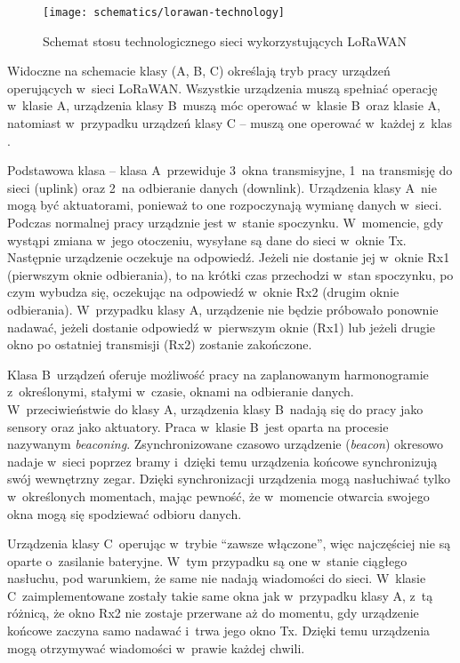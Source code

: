 \begin{figure}[!htbp]
    \centering
    \texttt{[image: schematics/lorawan-technology]}
    \caption{\label{img:lorawan-technology}Schemat stosu technologicznego sieci wykorzystujących LoRaWAN}
\end{figure}

Widoczne na schemacie klasy (A, B, C) określają tryb pracy urządzeń operujących w~sieci LoRaWAN. Wszystkie urządzenia
muszą spełniać operację w~klasie A, urządzenia klasy B~muszą móc operować w~klasie B~oraz klasie A, natomiast
w~przypadku urządzeń klasy C -- muszą one operować w~każdej z~klas \cite{lorawan-device-class}.

Podstawowa klasa -- klasa A~przewiduje 3~okna transmisyjne, 1~na transmisję do sieci (uplink) oraz 2~na odbieranie
danych (downlink). Urządzenia klasy A~nie mogą być aktuatorami, ponieważ to one rozpoczynają wymianę danych w~sieci.
Podczas normalnej pracy urządznie jest w~stanie spoczynku. W~momencie, gdy wystąpi zmiana w~jego otoczeniu, wysyłane są
dane do sieci w~oknie Tx. Następnie urządzenie oczekuje na odpowiedź. Jeżeli nie dostanie jej w~oknie Rx1 (pierwszym
oknie odbierania), to na krótki czas przechodzi w~stan spoczynku, po czym wybudza się, oczekując na odpowiedź w~oknie
Rx2 (drugim oknie odbierania). W~przypadku klasy A, urządzenie nie będzie próbowało ponownie nadawać, jeżeli dostanie
odpowiedź w~pierwszym oknie (Rx1) lub jeżeli drugie okno po ostatniej transmisji (Rx2) zostanie zakończone.

Klasa B~urządzeń oferuje możliwość pracy na zaplanowanym harmonogramie z~określonymi, stałymi w~czasie, oknami na
odbieranie danych. W~przeciwieństwie do klasy A, urządzenia klasy B~nadają się do pracy jako sensory oraz jako
aktuatory. Praca w~klasie B~jest oparta na procesie nazywanym \textsl{beaconing}. Zsynchronizowane czasowo urządzenie
(\textsl{beacon}) okresowo nadaje w~sieci poprzez bramy i~dzięki temu urządzenia końcowe synchronizują swój wewnętrzny
zegar. Dzięki synchronizacji urządzenia mogą nasłuchiwać tylko w~określonych momentach, mając pewność, że w~momencie
otwarcia swojego okna mogą się spodziewać odbioru danych.

Urządzenia klasy C~operując w~trybie \enquote{zawsze włączone}, więc najczęściej nie są oparte o~zasilanie bateryjne.
W~tym przypadku są one w~stanie ciągłego nasłuchu, pod warunkiem, że same nie nadają wiadomości do sieci. W~klasie
C~zaimplementowane zostały takie same okna jak w~przypadku klasy A, z~tą różnicą, że okno Rx2 nie zostaje przerwane aż
do momentu, gdy urządzenie końcowe zaczyna samo nadawać i~trwa jego okno Tx. Dzięki temu urządzenia mogą otrzymywać
wiadomości w~prawie każdej chwili.

